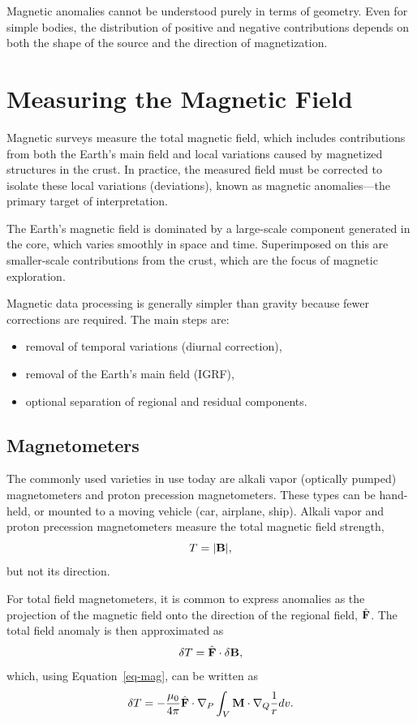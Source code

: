  Magnetic anomalies cannot be understood purely in terms of geometry. Even for simple bodies, the distribution of positive and negative contributions depends on both the shape of the source and the direction of magnetization.

\section{Measuring the Magnetic Field}

Magnetic surveys measure the total magnetic field, which includes contributions from both the Earth's main field and local variations caused by magnetized structures in the crust. In practice, the measured field must be corrected to isolate these local variations (deviations), known as magnetic anomalies---the primary target of interpretation.

The Earth's magnetic field is dominated by a large-scale component generated in the core, which varies smoothly in space and time. Superimposed on this are smaller-scale contributions from the crust, which are the focus of magnetic exploration.

Magnetic data processing is generally simpler than gravity because fewer corrections are required. The main steps are:
\begin{itemize}
    \item removal of temporal variations (diurnal correction),
    \item removal of the Earth's main field (IGRF),
    \item optional separation of regional and residual components.
\end{itemize}

\subsection{Magnetometers}

The commonly used varieties in use today are alkali vapor (optically pumped) magnetometers and proton precession magnetometers.  These types can be hand-held, or mounted to a moving vehicle (car, airplane, ship).  Alkali vapor and proton precession magnetometers measure the total magnetic field strength,
\[
T = |\vb{B}|,
\]
but not its direction.

For total field magnetometers, it is common to express anomalies as the projection of the magnetic field onto the direction of the regional field, $\hat{\vb{F}}$. The total field anomaly is then approximated as
\[
    \delta T = \hat{\vb{F}} \cdot \delta \vb{B},
\]
which, using Equation~\ref{eq-mag}, can be written as
\[
    \delta T = - \frac{\mu_{0}}{4\pi} \hat{\vb{F}} \cdot \nabla_{P}
    \int_{V} \vb{M} \cdot \nabla_{Q}
    \frac{1}{r} dv.
\]

